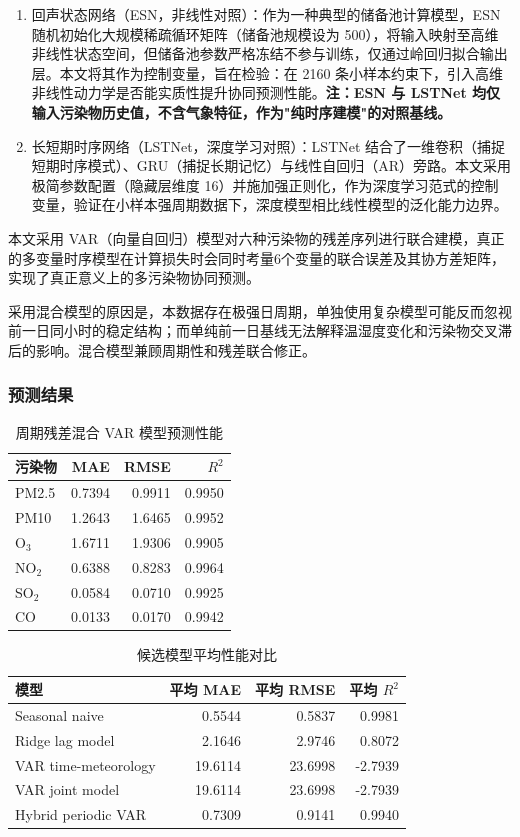 \documentclass[UTF8,a4paper,12pt]{ctexart}
\begin{document}
\begin{enumerate}
  \item 回声状态网络（ESN，非线性对照）：作为一种典型的储备池计算模型，ESN 随机初始化大规模稀疏循环矩阵（储备池规模设为 500），将输入映射至高维非线性状态空间，但储备池参数严格冻结不参与训练，仅通过岭回归拟合输出层。本文将其作为控制变量，旨在检验：在 2160 条小样本约束下，引入高维非线性动力学是否能实质性提升协同预测性能。\textbf{注：ESN 与 LSTNet 均仅输入污染物历史值，不含气象特征，作为"纯时序建模"的对照基线。}

  \item 长短期时序网络（LSTNet，深度学习对照）：LSTNet 结合了一维卷积（捕捉短期时序模式）、GRU（捕捉长期记忆）与线性自回归（AR）旁路。本文采用极简参数配置（隐藏层维度 16）并施加强正则化，作为深度学习范式的控制变量，验证在小样本强周期数据下，深度模型相比线性模型的泛化能力边界。
\end{enumerate}

本文采用 VAR（向量自回归）模型对六种污染物的残差序列进行联合建模，真正的多变量时序模型在计算损失时会同时考量6个变量的联合误差及其协方差矩阵，实现了真正意义上的多污染物协同预测。

采用混合模型的原因是，本数据存在极强日周期，单独使用复杂模型可能反而忽视前一日同小时的稳定结构；而单纯前一日基线无法解释温湿度变化和污染物交叉滞后的影响。混合模型兼顾周期性和残差联合修正。

\subsubsection{预测结果}

\begin{table}[H]
\centering
\caption{周期残差混合 VAR 模型预测性能}
\label{tab:hybrid_metrics}
\small
\begin{tabular}{lrrr}
\toprule
污染物 & MAE & RMSE & $R^2$\\
\midrule
PM2.5 & 0.7394 & 0.9911 & 0.9950\\
PM10 & 1.2643 & 1.6465 & 0.9952\\
O$_3$ & 1.6711 & 1.9306 & 0.9905\\
NO$_2$ & 0.6388 & 0.8283 & 0.9964\\
SO$_2$ & 0.0584 & 0.0710 & 0.9925\\
CO & 0.0133 & 0.0170 & 0.9942\\
\bottomrule
\end{tabular}
\end{table}

\begin{table}[H]
\centering
\caption{候选模型平均性能对比}
\label{tab:model_average}
\small
\begin{tabular}{lrrr}
\toprule
模型 & 平均 MAE & 平均 RMSE & 平均 $R^2$\\
\midrule
Seasonal naive & 0.5544 & 0.5837 & 0.9981\\
Ridge lag model & 2.1646 & 2.9746 & 0.8072\\
VAR time-meteorology & 19.6114 & 23.6998 & -2.7939\\
VAR joint model & 19.6114 & 23.6998 & -2.7939\\
Hybrid periodic VAR & 0.7309 & 0.9141 & 0.9940\\
\bottomrule
\end{tabular}
\end{table}
\end{document}
